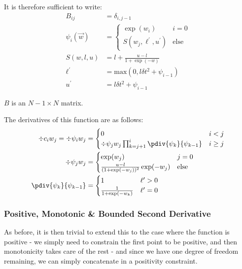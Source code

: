 \documentclass[]{article}
\begin{document}
				It is therefore sufficient to write:
				\begin{align}
					B_{ij} & = \delta_{i,j-1}
					\\
					\psi_i(\vec{w}) & = \begin{cases}
						\exp(w_i) & i = 0
						\\ 
						S(w_j,\ell^\prime,u^\prime) & \text{else}
					\end{cases}
					\\
					S(w,l,u) & = l + \frac{u- l}{1 + \exp(-w)}
					\\
					\ell^\prime &= \text{max}(0,l \delta t^2 + \psi_{i-1})
					\\
					u^\prime & = l \delta t^2 + \psi_{i-1}
				\end{align}

				$B$ is an $N-1 \times N$ matrix.

				The derivatives of this function are as follows:
				\begin{align}
					\div{c_i}{w_j} = \div{\psi_i}{w_j} & = \begin{cases} 0 & i < j
						\\
						\div{\psi_j}{w_j} \prod_{k = j+1}^i \pdiv{\psi_k}{\psi_{k-1}} & i\geq j
					\end{cases}
					\\
					\div{\psi_j}{w_j} & = \begin{cases} \exp(w_j) & j = 0
						\\
						\frac{u - l}{(1 + \exp(-w_j))^2} \exp(-w_j) & \text{else}
					\end{cases}
					\\
					\pdiv{\psi_k}{\psi_{k-1}} & = \begin{cases} 1 & \ell^\prime > 0
						\\
						\frac{1}{1 + \exp(-w_k)} & \ell^\prime = 0\end{cases}
				\end{align}
			\subsubsection{Positive, Monotonic \& Bounded Second Derivative}

				As before, it is then trivial to extend this to the case where the function is positive - we simply need to constrain the first point to be positive, and then monotonicity takes care of the rest - and since we have one degree of freedom remaining, we can simply concatenate in a positivity constraint.
\end{document}
